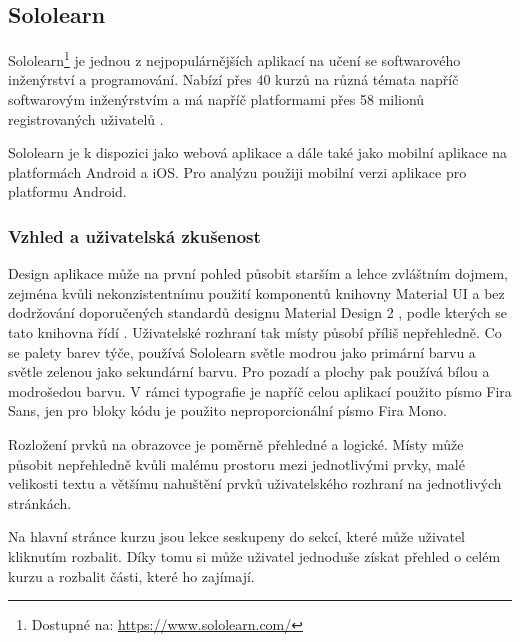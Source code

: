 \subsection{Sololearn}

Sololearn\footnote{Dostupné na: \href{https://www.sololearn.com/}{https://www.sololearn.com/}} je jednou z nejpopulárnějších aplikací na učení se softwarového inženýrství a programování. Nabízí přes 40 kurzů na různá témata napříč softwarovým inženýrstvím a má napříč platformami přes 58 milionů registrovaných uživatelů \cite{Sololearn}.

Sololearn je k dispozici jako webová aplikace a dále také jako mobilní aplikace na platformách Android a iOS. Pro analýzu použiji mobilní verzi aplikace pro platformu Android.

\subsubsection{Vzhled a uživatelská zkušenost}


Design aplikace může na první pohled působit starším a lehce zvláštním dojmem, zejména kvůli nekonzistentnímu použití komponentů knihovny Material UI a bez dodržování doporučených standardů designu Material Design 2 \cite{MaterialDesignDensity}, podle kterých se tato knihovna řídí \cite{MaterialUI}. Uživatelské rozhraní tak místy působí příliš nepřehledně. Co se palety barev týče, používá Sololearn světle modrou jako primární barvu a světle zelenou jako sekundární barvu. Pro pozadí a plochy pak používá bílou a modrošedou barvu. V rámci typografie je napříč celou aplikací použito písmo Fira Sans, jen pro bloky kódu je použito neproporcionální písmo Fira Mono.

Rozložení prvků na obrazovce je poměrně přehledné a logické. Místy může působit nepřehledně kvůli malému prostoru mezi jednotlivými prvky, malé velikosti textu a většímu nahuštění prvků uživatelského rozhraní na jednotlivých stránkách.

Na hlavní stránce kurzu jsou lekce seskupeny do sekcí, které může uživatel kliknutím rozbalit. Díky tomu si může uživatel jednoduše získat přehled o celém kurzu a rozbalit části, které ho zajímají.


